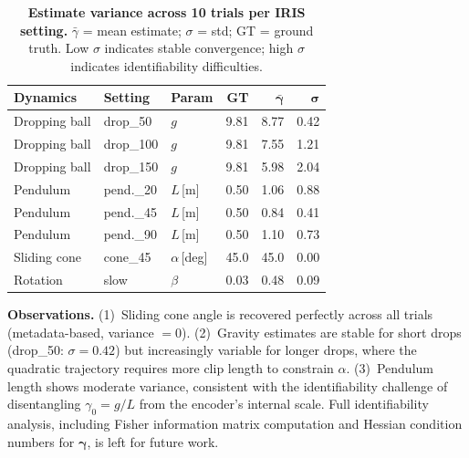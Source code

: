 \documentclass[runningheads]{llncs}
\begin{document}
\begin{table}[h]
  \centering
  \caption{\textbf{Estimate variance across 10 trials per IRIS setting.}
  $\bar{\gamma}$ = mean estimate; $\sigma$ = std; GT = ground truth.
  Low $\sigma$ indicates stable convergence; high $\sigma$ indicates
  identifiability difficulties.}
  \label{tab:id_variance}
  \footnotesize
  \setlength{\tabcolsep}{5pt}
  \renewcommand{\arraystretch}{1.15}
  \begin{tabular}{@{}lllrrr@{}}
    \toprule
    \textbf{Dynamics} & \textbf{Setting} & \textbf{Param}
      & \textbf{GT} & $\bm{\bar{\gamma}}$ & $\bm{\sigma}$ \\
    \midrule
    Dropping ball & drop\_50  & $g$ & 9.81 & 8.77 & 0.42 \\
    Dropping ball & drop\_100 & $g$ & 9.81 & 7.55 & 1.21 \\
    Dropping ball & drop\_150 & $g$ & 9.81 & 5.98 & 2.04 \\
    Pendulum      & pend.\_20 & $L$\,[m] & 0.50 & 1.06 & 0.88 \\
    Pendulum      & pend.\_45 & $L$\,[m] & 0.50 & 0.84 & 0.41 \\
    Pendulum      & pend.\_90 & $L$\,[m] & 0.50 & 1.10 & 0.73 \\
    Sliding cone  & cone\_45  & $\alpha$\,[deg] & 45.0 & 45.0 & 0.00 \\
    Rotation      & slow      & $\beta$ & 0.03 & 0.48 & 0.09 \\
    \bottomrule
  \end{tabular}
\end{table}

\textbf{Observations.}  (1)~Sliding cone angle is recovered perfectly
across all trials (metadata-based, variance $= 0$).  (2)~Gravity estimates
are stable for short drops (drop\_50: $\sigma = 0.42$) but increasingly
variable for longer drops, where the quadratic trajectory requires more
clip length to constrain $\alpha$.  (3)~Pendulum length shows moderate
variance, consistent with the identifiability challenge of disentangling
$\gamma_0 = g/L$ from the encoder's internal scale.  Full identifiability
analysis, including Fisher information matrix computation and Hessian
condition numbers for $\boldsymbol{\gamma}$, is left for future work.


{\sloppy\printbibliography}
\end{document}
